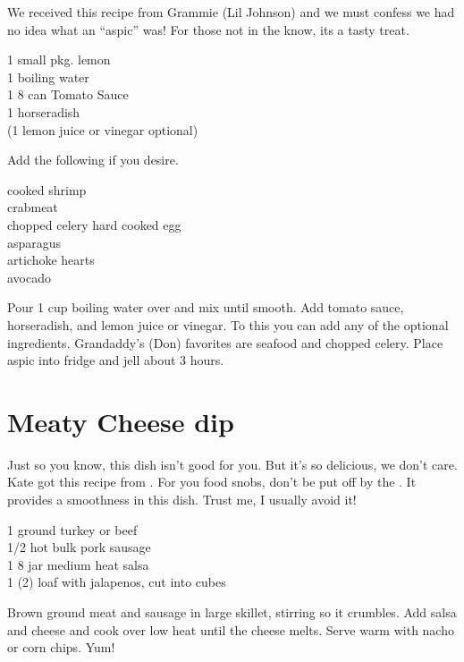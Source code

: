 \begin{open}
  We received this recipe from Grammie (Lil Johnson) and we must confess
  we had no idea what an ``aspic'' was!  For those not in the know, its a tasty
  treat.
\end{open}
\begin{ingredients}
  1 small pkg. lemon \\
  \SI{1}{\cup} boiling water \\
  1 \SI{8}{\ounce} can  Tomato Sauce \\
  \SI{1}{\teaspoon} horseradish \\
  (\SI{1}{\teaspoon} lemon juice or vinegar optional)
\end{ingredients}
Add the following if you desire.
\begin{ingredients}
  cooked shrimp \\
  crabmeat \\
  chopped celery
  hard cooked egg \\
  asparagus \\
  artichoke hearts \\
  avocado
\end{ingredients}
Pour 1 cup boiling water over  and mix until smooth. Add tomato
sauce, horseradish, and lemon juice or vinegar.  To this you can add any of
the optional ingredients. Grandaddy's (Don) favorites are seafood and chopped
celery. Place aspic into fridge and jell about 3 hours.

\section{Meaty Cheese dip}

\begin{open}
  Just so you know, this dish isn't good for you. But it's so delicious,
  we don't care. Kate got this recipe from .  For you
  food snobs, don't be put off by the .  It provides a
  smoothness in this dish. Trust me, I usually avoid it!
\end{open}
\begin{ingredients}
  \SI{1}{\pound} ground turkey or beef\\
  \SI{1/2}{\pound} hot bulk pork sausage\\
  1 \SI{8}{\ounce} jar medium heat salsa\\
  1 (\SI{2}{\pound}) loaf  with jalapenos, cut into cubes
\end{ingredients}
Brown ground meat and sausage in large skillet, stirring so it crumbles. Add
salsa and cheese and cook over low heat until the cheese melts. Serve warm
with nacho or corn chips. Yum!

